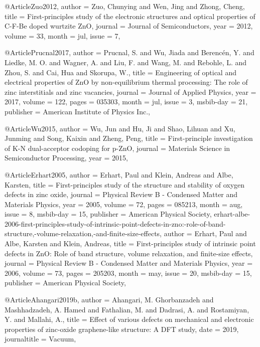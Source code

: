 @Article{Zuo2012,
  author  = {Zuo, Chunying and Wen, Jing and Zhong, Cheng},
  title   = {First-principles study of the electronic structures and optical properties of C-F-Be doped wurtzite ZnO},
  journal = {Journal of Semiconductors},
  year    = {2012},
  volume  = {33},
  month   = jul,
  issue   = {7},
}

@Article{Prucnal2017,
  author    = {Prucnal, S. and Wu, Jiada and Berencén, Y. and Liedke, M. O. and Wagner, A. and Liu, F. and Wang, M. and Rebohle, L. and Zhou, S. and Cai, Hua and Skorupa, W.},
  title     = {Engineering of optical and electrical properties of ZnO by non-equilibrium thermal processing: The role of zinc interstitials and zinc vacancies},
  journal   = {Journal of Applied Physics},
  year      = {2017},
  volume    = {122},
  pages     = {035303},
  month     = jul,
  issue     = {3},
  msbib-day = {21},
  publisher = {American Institute of Physics Inc.},
}

@Article{Wu2015,
  author  = {Wu, Jun and Hu, Ji and Shao, Lihuan and Xu, Junming and Song, Kaixin and Zheng, Peng},
  title   = {First-principle investigation of K-N dual-acceptor codoping for p-ZnO},
  journal = {Materials Science in Semiconductor Processing},
  year    = {2015},
}

@Article{Erhart2005,
  author    = {Erhart, Paul and Klein, Andreas and Albe, Karsten},
  title     = {First-principles study of the structure and stability of oxygen defects in zinc oxide},
  journal   = {Physical Review B - Condensed Matter and Materials Physics},
  year      = {2005},
  volume    = {72},
  pages     = {085213},
  month     = aug,
  issue     = {8},
  msbib-day = {15},
  publisher = {American Physical Society},
}
{erhart-albe-2006-first-principles-study-of-intrinsic-point-defects-in-zno:-role-of-band-structure,-volume-relaxation,-and-finite-size-effects,
  author    = {Erhart, Paul and Albe, Karsten and Klein, Andreas},
  title     = {First-principles study of intrinsic point defects in ZnO: Role of band structure, volume relaxation, and finite-size effects},
  journal   = {Physical Review B - Condensed Matter and Materials Physics},
  year      = {2006},
  volume    = {73},
  pages     = {205203},
  month     = may,
  issue     = {20},
  msbib-day = {15},
  publisher = {American Physical Society},
}

@Article{Ahangari2019b,
  author       = {Ahangari, M. Ghorbanzadeh and Mashhadzadeh, A. Hamed and Fathalian, M. and Dadrasi, A. and Rostamiyan, Y. and Mallahi, A.},
  title        = {Effect of various defects on mechanical and electronic properties of zinc-oxide graphene-like structure: A DFT study},
  date         = {2019},
  journaltitle = {Vacuum},
}

